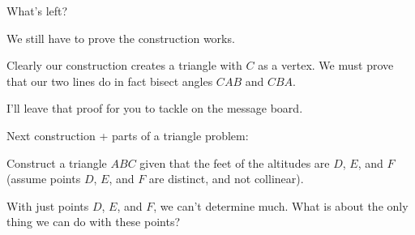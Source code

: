 

What's left?








We still have to prove the construction works.

Clearly our construction creates a triangle with $C$ as a vertex. We must prove that our two lines do in fact bisect angles $CAB$ and $CBA$.

I'll leave that proof for you to tackle on the message board.

\vspace{10pt}
Next construction + parts of a triangle problem:

\begin{example}
    Construct a triangle $ABC$ given that the feet of the altitudes are $D$, $E$, and $F$ (assume points $D$, $E$, and $F$ are distinct, and not collinear).    
\end{example}

With just points $D$, $E$, and $F$, we can't determine much. What is about the only thing we can do with these points?

